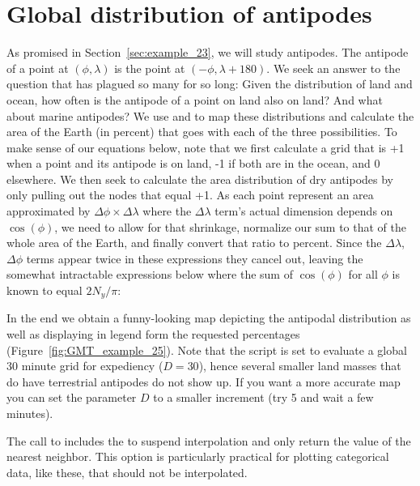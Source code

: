 \section{Global distribution of antipodes}
\label{sec:example_25}

As promised in Section~\ref{sec:example_23}, we will study antipodes.  The antipode of a point at
$(\phi, \lambda)$ is the point at $(-\phi, \lambda + 180)$.  We seek an answer
to the question that has plagued so many for so long: Given the distribution of
land and ocean, how often is the antipode of a point on land also on land? And
what about marine antipodes?  We use  and 
to map these distributions and calculate the area of the Earth (in percent)
that goes with each of the three possibilities.  To make sense of our 
equations below, note that we first calculate a grid that is +1 when a point and its
antipode is on land, -1 if both are in the ocean, and 0 elsewhere.  We then
seek to calculate the area distribution of dry antipodes by only pulling out the nodes
that equal +1.  As each point represent an area approximated by $\Delta \phi \times \Delta \lambda$
where the $\Delta \lambda$ term's actual dimension depends on $\cos (\phi)$, we need
to allow for that shrinkage, normalize our sum to that of the whole area of the Earth,
and finally convert that ratio to percent.  Since the $\Delta \lambda$, $\Delta \phi$ terms
appear twice in these expressions they cancel out, leaving the somewhat
intractable expressions below where the sum of $\cos (\phi)$ for all $\phi$ is known to equal $2N_y / \pi$:


In the end we obtain a funny-looking map depicting the antipodal distribution as
well as displaying in legend form the requested percentages (Figure~\ref{fig:GMT_example_25}).
Note that the script is set to evaluate a global 30 minute grid for expediency ($D = 30$), hence
several smaller land masses that do have terrestrial antipodes do not show up.  If you want
a more accurate map you can set the parameter $D$ to a smaller increment (try 5 and wait a
few minutes).

The call to  includes the  to suspend interpolation and only
return the value of the nearest neighbor. This option is particularly practical for plotting
categorical data, like these, that should not be interpolated.


